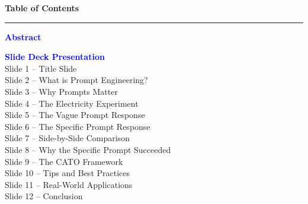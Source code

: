 \documentclass[12pt,a4paper]{article}
\begin{document}
\begin{center}
{\LARGE\bfseries\textcolor{dark}{Table of Contents}}\\[0.3cm]
\rule{0.4\textwidth}{0.8pt}
\end{center}

\vspace{0.8cm}

\begin{center}
\begin{minipage}{0.85\textwidth}
\noindent\textbf{\textcolor{blue}{Abstract}} \dotfill \pageref{sec:abstract}

\vspace{0.6cm}
\noindent\textbf{\textcolor{blue}{Slide Deck Presentation}}\\[0.2cm]
\hspace{0.5cm}Slide 1 -- Title Slide \dotfill \pageref{sec:s1}\\[0.15cm]
\hspace{0.5cm}Slide 2 -- What is Prompt Engineering? \dotfill \pageref{sec:s2}\\[0.15cm]
\hspace{0.5cm}Slide 3 -- Why Prompts Matter \dotfill \pageref{sec:s3}\\[0.15cm]
\hspace{0.5cm}Slide 4 -- The Electricity Experiment \dotfill \pageref{sec:s4}\\[0.15cm]
\hspace{0.5cm}Slide 5 -- The Vague Prompt Response \dotfill \pageref{sec:s5}\\[0.15cm]
\hspace{0.5cm}Slide 6 -- The Specific Prompt Response \dotfill \pageref{sec:s6}\\[0.15cm]
\hspace{0.5cm}Slide 7 -- Side-by-Side Comparison \dotfill \pageref{sec:s7}\\[0.15cm]
\hspace{0.5cm}Slide 8 -- Why the Specific Prompt Succeeded \dotfill \pageref{sec:s8}\\[0.15cm]
\hspace{0.5cm}Slide 9 -- The CATO Framework \dotfill \pageref{sec:s9}\\[0.15cm]
\hspace{0.5cm}Slide 10 -- Tips and Best Practices \dotfill \pageref{sec:s10}\\[0.15cm]
\hspace{0.5cm}Slide 11 -- Real-World Applications \dotfill \pageref{sec:s11}\\[0.15cm]
\hspace{0.5cm}Slide 12 -- Conclusion \dotfill \pageref{sec:s12}
\end{minipage}
\end{center}
\end{document}
